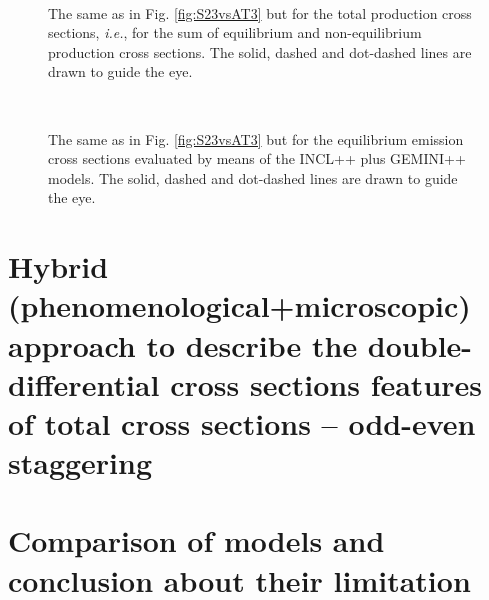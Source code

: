 \begin{figure*}
  \centering
  \\
  \caption{The same as in Fig. \ref{fig:S23vsAT3} but for the total
  production cross sections, \emph{i.e.}, for the sum of equilibrium and non-equilibrium production cross sections.
  The solid, dashed and dot-dashed lines are drawn to guide the eye.
  }
  \label{fig:TOTG23T3}
\end{figure*}





\begin{figure*}
  \centering
  \\
  \caption{The same as in Fig. \ref{fig:S23vsAT3} but for the equilibrium
  emission cross sections evaluated by means of the INCL++ plus GEMINI++
  models. The solid, dashed and dot-dashed lines are drawn to guide the eye.
  }
  \label{fig:GEMseparateT3}
\end{figure*}
\section{Hybrid (phenomenological+microscopic) approach to describe the double-differential cross sections features of total cross sections – odd-even staggering}
\section{Comparison of models and conclusion about their limitation}
